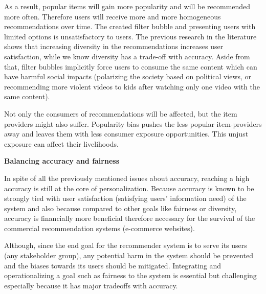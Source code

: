 As a result, popular items will gain more popularity and will be recommended more often. 
Therefore users will receive more and more homogeneous recommendations over time. The created filter bubble and presenting users with limited options is unsatisfactory to users. The previous research in the literature shows that increasing diversity in the recommendations increases user satisfaction, while we know diversity has a trade-off with accuracy. Aside from that, filter bubbles implicitly force users to consume the same content which can have harmful social impacts (polarizing the society based on political views, or recommending more violent videos to kids after watching only one video with the same content). 

Not only the consumers of recommendations will be affected, but the item providers might also suffer. Popularity bias pushes the less popular item-providers away and leaves them with less consumer exposure opportunities. This unjust exposure can affect their livelihoods.


\textbf{Balancing accuracy and fairness}

In spite of all the previously mentioned issues about accuracy, reaching a high accuracy is still at the core of personalization. Because accuracy is known to be strongly tied with user satisfaction (satisfying users' information need) of the system and also because compared to other goals like fairness or diversity, accuracy is financially more beneficial therefore necessary for the survival of the commercial recommendation systems (e-commerce websites).

Although, since the end goal for the recommender system is to serve its users (any stakeholder group), any potential harm in the system should be prevented and the biases towards its users should be mitigated. Integrating and operationalizing a goal such as fairness to the system is essential but challenging especially because it has major tradeoffs with accuracy.



